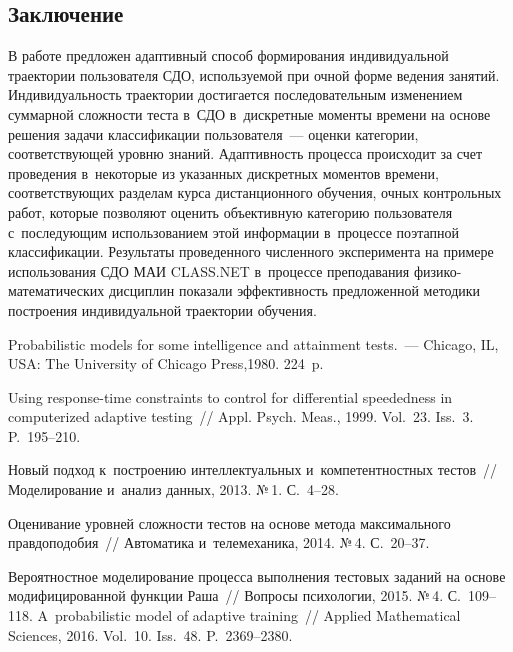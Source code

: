 \begin{multicols}{2}
      
\section{Заключение}

      В работе предложен адаптивный способ формирования индивидуальной 
траектории пользователя СДО, используемой при очной форме ведения занятий. 
Индивидуальность траектории достигается последовательным изменением суммарной 
сложности теста в~СДО в~дискретные моменты времени на основе решения задачи 
классификации пользователя~--- оценки категории, соответствующей уровню знаний. 
Адаптивность процесса происходит за счет проведения в~некоторые из указанных 
дискретных моментов времени, соответствующих разделам курса дистанционного 
обучения, очных контрольных работ, которые позволяют оценить объективную категорию 
пользователя с~последующим использованием этой информации в~процессе поэтапной 
классификации. Результаты проведенного численного эксперимента на примере 
использования СДО МАИ CLASS.NET в~процессе преподавания физико-математических 
дисциплин показали эффективность предложенной методики построения индивидуальной 
траектории обучения.
      
{\small\frenchspacing
 {%
 \begin{thebibliography}{99}

 Probabilistic models for some intelligence and attainment
 tests.~--- Chicago, IL, USA: The 
University of Chicago Press,1980. 224~p. 

 Using  
response-time constraints to control for differential speededness in computerized adaptive 
testing~// Appl. Psych. Meas., 1999. Vol.~23. Iss.~3. P.~195--210.

 Новый подход 
к~построению интеллектуальных и~компетентностных тестов~// Моделирование и~анализ 
данных, 2013. №\,1. С.~4--28.

 Оценивание уровней сложности тестов на основе 
метода максимального правдоподобия~// Автоматика и~телемеханика, 2014. №\,4.  
С.~20--37.

Вероятностное моделирование процесса выполнения тестовых заданий на основе 
модифицированной функции Раша~// Вопросы психологии, 2015. №\,4. С.~109--118.
 A~probabilistic model of adaptive training~// Applied Mathematical Sciences, 
2016. Vol.~10. Iss.~48. P.~2369--2380.


\end{thebibliography}}}
\end{multicols}
